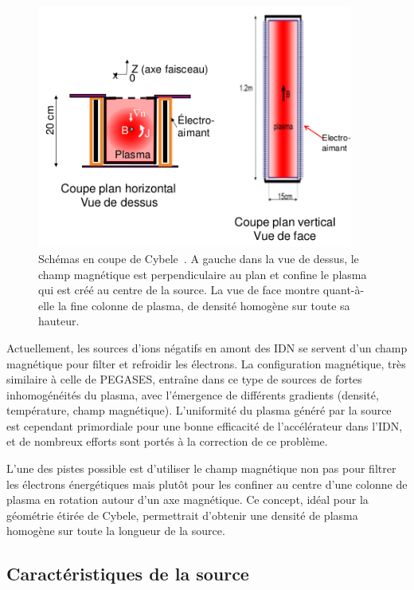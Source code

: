 \begin{refsection}
\begin{figure}[!htbp]
  \centering
    \includegraphics[height=8cm]{figures/4-cybeleSchema.png}
    \caption{Schémas en coupe de Cybele~\parencite{SimoninHDR}. A gauche dans la
vue de dessus, le champ magnétique est perpendiculaire au plan et confine le
plasma qui est créé au centre de la source. La vue de face montre quant-à-elle
la fine colonne de plasma, de densité homogène sur toute sa hauteur.
\label{4-cybeleSchema}}
\end{figure}	

Actuellement, les sources d'ions négatifs en amont des IDN se servent d'un champ
magnétique pour filter et refroidir les électrons. La configuration magnétique,
très similaire à celle de PEGASES, entraîne dans ce type de sources de fortes
inhomogénéités du plasma, avec l'émergence de différents gradients
(densité, température, champ magnétique). L'uniformité du plasma généré par
la source est cependant primordiale pour une bonne efficacité de l'accélérateur
dans l'IDN, et de nombreux efforts sont portés à la correction de ce problème.

L'une des pistes possible est d'utiliser le champ magnétique non pas pour
filtrer les électrons énergétiques mais plutôt pour les confiner au centre
d'une colonne de plasma en rotation autour d'un axe magnétique. Ce concept,
idéal pour la géométrie étirée de Cybele, permettrait d'obtenir une densité de
plasma homogène sur toute la longueur de la source. 

\subsection{Caractéristiques de la source}


\end{refsection}
